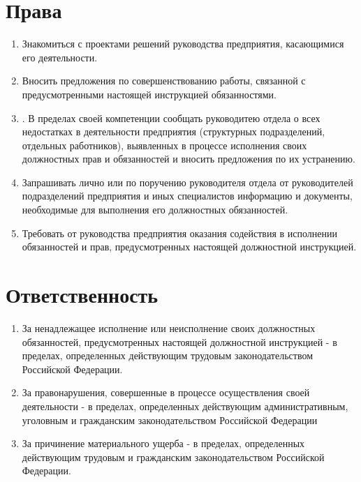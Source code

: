 \documentclass[a4paper,12pt]{article}
\begin{document}
\section{Права}
\begin{enumerate}
	\item Знакомиться с проектами решений руководства предприятия, касающимися его деятельности.
	\item Вносить предложения по совершенствованию работы, связанной с предусмотренными настоящей инструкцией обязанностями.
	\item . В пределах своей компетенции сообщать руководитею отдела о всех недостатках в деятельности предприятия (структурных подразделений, отдельных работников), выявленных в процессе исполнения своих должностных прав и обязанностей и вносить предложения по их устранению.
	\item Запрашивать лично или по поручению руководителя отдела от руководителей подразделений предприятия и иных специалистов информацию и документы, необходимые для выполнения его должностных обязанностей.
	\item Требовать от руководства предприятия оказания содействия в исполнении обязанностей и прав, предусмотренных настоящей должностной инструкцией.
\end{enumerate}

\section{Ответственность}


\begin{enumerate}
	\item За ненадлежащее исполнение или неисполнение своих должностных обязанностей, предусмотренных настоящей должностной инструкцией - в пределах, определенных действующим трудовым законодательством Российской Федерации.
	\item За правонарушения, совершенные в процессе осуществления своей деятельности - в пределах, определенных действующим административным, уголовным и гражданским законодательством Российской Федерации
	\item За причинение материального ущерба - в пределах, определенных действующим трудовым и гражданским законодательством Российской Федерации.
\end{enumerate}

\newpage
\end{document}
